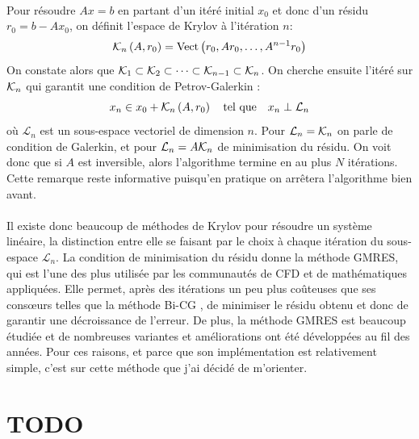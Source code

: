 		\paragraph{}
		Pour résoudre $Ax = b$ en partant d'un itéré initial $x_0$ et donc d'un résidu $r_0 = b - Ax_0$, on définit l'espace de Krylov à l'itération $n$:
		\begin{equation}\label{eqn:krylov}
			\krylov[A, r_0]{n} = \operatorname{Vect}\left(r_0, Ar_0, \dots, A^{n-1}r_0\right)
		\end{equation}
		On constate alors que $\krylov{1}\subset\krylov{2}\subset\dots\subset\krylov{n-1}\subset\krylov{n}$.
		On cherche ensuite l'itéré sur $\krylov{n}$ qui garantit une condition de Petrov-Galerkin \cite{SimonciniSzyld2007} :
		\begin{equation}\label{eqn:x_n}
			x_n \in x_0 + \krylov[A, r_0]{n}\quad\textrm{tel que}\quad x_n \perp \mathcal{L}_n
		\end{equation}
		où $\mathcal{L}_n$ est un sous-espace vectoriel de dimension $n$.
		Pour $\mathcal{L}_n = \krylov{n}$ on parle de condition de Galerkin, et pour $\mathcal{L}_n = A\krylov{n}$ de minimisation du résidu.
		On voit donc que si $A$ est inversible, alors l'algorithme termine en au plus $N$ itérations.
		Cette remarque reste informative puisqu'en pratique on arrêtera l'algorithme bien avant.

		\paragraph{}
		Il existe donc beaucoup de méthodes de Krylov pour résoudre un système linéaire, la distinction entre elle se faisant par le choix à chaque itération du sous-espace $\mathcal{L}_n$.
		La condition de minimisation du résidu donne la méthode GMRES, qui est l'une des plus utilisée par les communautés de CFD et de mathématiques appliquées.
		Elle permet, après des itérations un peu plus coûteuses que ses consœurs telles que la méthode Bi-CG \cite{TrefethenBau1997}, de minimiser le résidu obtenu et donc de garantir une décroissance de l'erreur.
		De plus, la méthode GMRES est beaucoup étudiée et de nombreuses variantes et améliorations ont été développées au fil des années.
		Pour ces raisons, et parce que son implémentation est relativement simple, c'est sur cette méthode que j'ai décidé de m'orienter.

\section{TODO}


